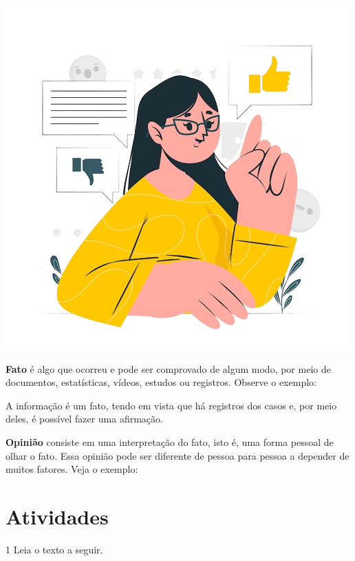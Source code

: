 \begin{conteudo}
\begin{conteudo}
\begin{conteudo}
\begin{conteudo}
{\includegraphics[width=\textwidth]{media/image25.png}

\textbf{Fato} é algo que ocorreu e pode ser comprovado de algum modo,
por meio de documentos, estatísticas, vídeos, estudos ou registros.
Observe o exemplo:


A informação é um fato, tendo em vista que há registros dos casos e, por
meio deles, é possível fazer uma afirmação.

\textbf{Opinião} consiste em uma interpretação do fato, isto é, uma
forma pessoal de olhar o fato. Essa opinião pode ser diferente de pessoa
para pessoa a depender de muitos fatores. Veja o exemplo:

}

\section{Atividades}

\num{1} Leia o texto a seguir.



\end{conteudo}
\end{conteudo}
\end{conteudo}
\end{conteudo}
